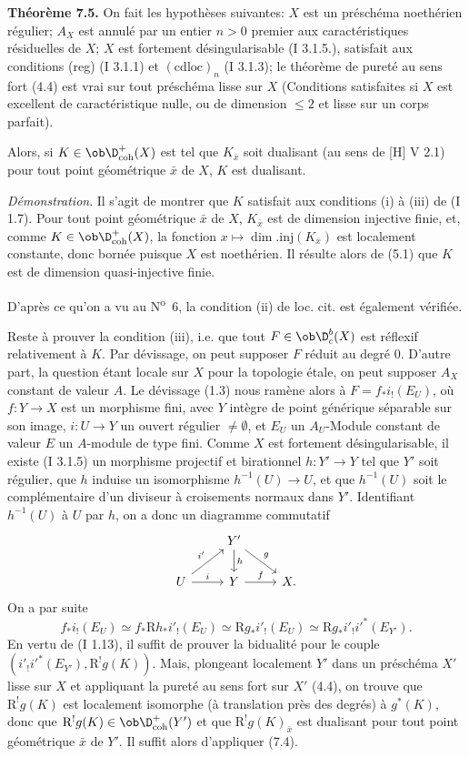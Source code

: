 \textbf{Théorème 7.5.} On fait les hypothèses suivantes: $X$ est un préschéma noethérien régulier; $A_X$ est annulé par un entier $n>0$ premier aux caractéristiques résiduelles de $X$; $X$ est fortement désingularisable (I 3.1.5.), satisfait aux conditions (reg) (I 3.1.1) et $(\mathrm{cdloc})_n$ (I 3.1.3); le théorème de pureté au sens fort (4.4) est vrai sur tout préschéma lisse sur $X$ (Conditions satisfaites si $X$ est excellent de caractéristique nulle, ou de dimension $\leq2$ et lisse sur un corps parfait).

Alors, si $K\in\ob\D^{+}_{\mathrm{coh}}(X)$ est tel que $K_{\bar{x}}$ soit dualisant (au sens de [H] V 2.1) pour tout point géométrique $\bar{x}$ de $X$, $K$ est dualisant.

\emph{Démonstration}. Il s'agit de montrer que $K$ satisfait aux conditions (i) à (iii) de (I 1.7). Pour tout point géométrique $\bar{x}$ de $X$, $K_{\bar{x}}$ est de
dimension injective finie, et, comme $K\in\ob\D^{+}_{\mathrm{coh}}(X)$, la fonction $x\mapsto \dim.\mathrm{inj}(K_{\bar{x}})$ est localement constante, donc bornée puisque $X$ est noethérien. Il résulte alors de (5.1) que $K$ est de dimension quasi-injective finie.

D'après ce qu'on a vu au N\textsuperscript{o}~6, la condition (ii) de loc. cit. est également vérifiée.

Reste à prouver la condition (iii), i.e. que tout $F\in\ob\D_c^b(X)$ est réflexif relativement à $K$. Par dévissage, on peut supposer $F$ réduit au degré $0$. D'autre part, la question étant locale sur $X$ pour la topologie étale, on peut supposer $A_X$ constant de valeur $A$. Le dévissage (1.3) nous ramène alors à $F=f_*i_!(E_U)$, où $f:Y\to X$ est un morphisme fini, avec $Y$ intègre de point générique séparable sur son image, $i:U\to Y$ un ouvert régulier $\neq\emptyset$, et $E_U$ un $A_U$-Module constant de valeur $E$ un $A$-module de type fini. Comme $X$ est fortement désingularisable, il existe (I 3.1.5) un morphisme projectif et birationnel $h:Y'\to Y$ tel que $Y'$ soit régulier, que $h$ induise un isomorphisme $h^{-1}(U)\to U$, et que $h^{-1}(U)$ soit le complémentaire d'un diviseur à croisements normaux dans $Y'$. Identifiant $h^{-1}(U)$ à $U$ par $h$, on a donc un diagramme commutatif
\[
\begin{tikzcd}
& Y' \arrow[d,"h"] \arrow[dr,"g"] & \\
U \arrow[ur,"i'"] \arrow[r,"i"] & Y \arrow[r,"f"] & X.
\end{tikzcd}
\]
On a par suite
\[
        f_*i_!(E_U)\simeq f_*\mathrm{R} h_* i'_!(E_U)\simeq \mathrm{R} g_* i'_!(E_U)\simeq \mathrm{R} g_* i'_! i'^*(E_{Y'}).
\]
En vertu de (I 1.13), il suffit de prouver la bidualité pour le couple 
$(i'_!i'^*(E_{Y'}),\mathrm{R}^!g(K))$. Mais, plongeant localement $Y'$ dans un préschéma $X'$
lisse sur $X$ et appliquant la pureté au sens fort sur $X'$ (4.4), on trouve que $\mathrm{R}^!g(K)$ est localement isomorphe (à translation près des degrés) à $g^*(K)$, donc que $\mathrm{R}^!g(K)\in\ob\D^{+}_{\mathrm{coh}}(Y')$ et que $\mathrm{R}^!g(K)_{\bar{x}}$ est dualisant pour tout point géométrique $\bar{x}$ de $Y'$. Il suffit alors d'appliquer (7.4).

